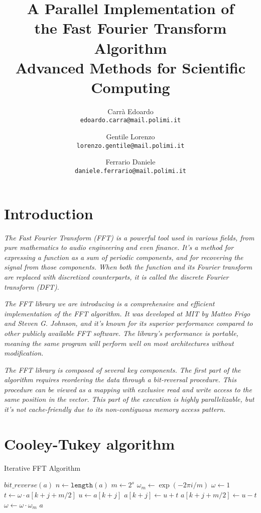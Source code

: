 \documentclass[12pt]{article}
\author{
  Carrà Edoardo\\
  \texttt{edoardo.carra@mail.polimi.it}
  \and
  Gentile Lorenzo\\
  \texttt{lorenzo.gentile@mail.polimi.it}
  \and
  Ferrario Daniele\\
  \texttt{daniele.ferrario@mail.polimi.it}
}
\title{\textbf{A Parallel Implementation of}\\
\textbf{the Fast Fourier Transform Algorithm}\\
{\normal Advanced Methods for Scientific Computing}}
\date{}
\begin{document}
\maketitle

\section{Introduction}

\textit{The Fast Fourier Transform (FFT) is a powerful tool used in various fields, from pure mathematics to audio engineering and even finance. It's a method for expressing a function as a sum of periodic components, and for recovering the signal from those components. When both the function and its Fourier transform are replaced with discretized counterparts, it is called the discrete Fourier transform (DFT).}
\bigskip

\textit{The FFT library we are introducing is a comprehensive and efficient implementation of the FFT algorithm. It was developed at MIT by Matteo Frigo and Steven G. Johnson, and it's known for its superior performance compared to other publicly available FFT software. The library's performance is portable, meaning the same program will perform well on most architectures without modification.}
\bigskip

\textit{The FFT library is composed of several key components. The first part of the algorithm requires reordering the data through a bit-reversal procedure. This procedure can be viewed as a mapping with exclusive read and write access to the same position in the vector. This part of the execution is highly parallelizable, but it's not cache-friendly due to its non-contiguous memory access pattern.}

\pagebreak
\section{Cooley-Tukey algorithm}
\begin{algorithm}
\caption{Iterative FFT Algorithm}
\begin{algorithmic}[1]
{
  \State $bit\_reverse(a)$
  \State $n \gets \texttt{length}(a)$
  {
      \State $m \gets 2^s$
      \State $\omega_m \gets \exp(-2\pi i/m)$
      {
          \State $\omega \gets 1$
          {
            \State $t \gets \omega \cdot a[k + j + m/2]$
            \State $u \gets a[k + j]$
            \State $a[k + j] \gets u + t$
            \State $a[k + j + m/2] \gets u - t$
            \State $\omega \gets \omega \cdot \omega_m$
          }
      }
  }
  \State \Return $a$   
}
\end{algorithmic}
\end{algorithm}
\end{document}
